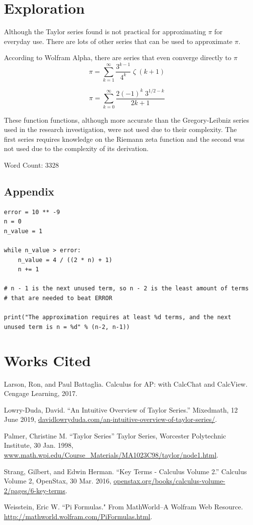 \documentclass[12pt, titlepage]{article}
\begin{document}
\section{Exploration}
Although the Taylor series found is not practical for approximating \(\pi\) for everyday use. There are lots of other series that can be used to approximate \(\pi\). 

According to Wolfram Alpha, there are series that even converge directly to \(\pi\)
\begin{equation*}
    \pi = \sum_{k=1}^{\infty} \frac{3^{k-1}}{4^{k}} \; \zeta \;(k+1)
\end{equation*}

\begin{equation*}
    \pi = \sum_{k=0}^{\infty} \frac{2(-1)^{k} \; 3^{1/2-k}}{{2k+1}}
\end{equation*}

These function functions, although more accurate than the Gregory-Leibniz series used in the research investigation, were not used due to their complexity. The first series requires knowledge on the Riemann zeta function and the second was not used due to the complexity of its derivation.

Word Count: 3328

\pagebreak
\begin{appendix}
\section{Appendix}
\begin{verbatim}
error = 10 ** -9
n = 0
n_value = 1

while n_value > error:
    n_value = 4 / ((2 * n) + 1)
    n += 1

# n - 1 is the next unused term, so n - 2 is the least amount of terms 
# that are needed to beat ERROR

print("The approximation requires at least %d terms, and the next
unused term is n = %d" % (n-2, n-1))
\end{verbatim}
\end{appendix}

\pagebreak
\section{Works Cited}

Larson, Ron, and Paul Battaglia. Calculus for AP: with CalcChat and CalcView. Cengage Learning, 2017.

Lowry-Duda, David. ``An Intuitive Overview of Taylor Series.” Mixedmath, 12 June 2019, \url{davidlowryduda.com/an-intuitive-overview-of-taylor-series/}.

Palmer, Christine M. ``Taylor Series” Taylor Series, Worcester Polytechnic Institute, 30 Jan. 1998, \url{www.math.wpi.edu/Course_Materials/MA1023C98/taylor/node1.html}.

Strang, Gilbert, and Edwin Herman. ``Key Terms - Calculus Volume 2.” Calculus Volume 2, OpenStax, 30 Mar. 2016, \url{openstax.org/books/calculus-volume-2/pages/6-key-terms}.

Weisstein, Eric W. ``Pi Formulas." From MathWorld--A Wolfram Web Resource. \url{http://mathworld.wolfram.com/PiFormulas.html}.
\end{document}
